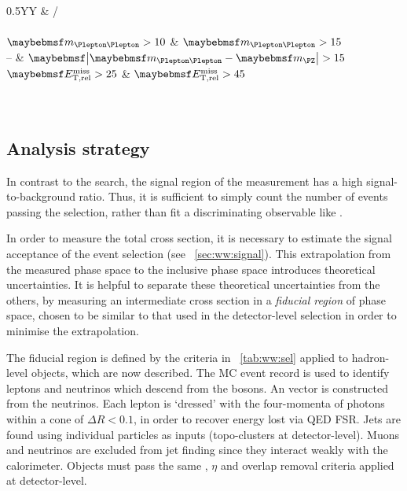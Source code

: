 \begin{description}
	\begin{table}[b]
		\begin{tabularx}{0.5\textwidth}{YY}
			\toprule
			\emch & \eech/\mmch \\
			\midrule
			 \\
			$\mll > 10$    & $\mll > 15$ \\
			--             & $\mods{\mll - \mZ} > 15$ \\
			$\metrel > 25$ & $\metrel > 45$ \\
			 \\
			 \\
			\bottomrule
		\end{tabularx}
		\caption{Summary of \WW event selection. Cuts are given in \GeV.}
		\label{tab:ww:sel}
	\end{table}

\end{description}



\subsection{Analysis strategy}

In contrast to the \HWW search, the signal region of the \WW measurement has a high 
signal-to-background ratio. Thus, it is sufficient to simply count the number of events 
passing the selection, rather than fit a discriminating observable like \mt.

In order to measure the total \WW cross section, it is necessary to estimate the signal 
acceptance of the event selection (see \Section~\ref{sec:ww:signal}). This extrapolation 
from the measured phase space to the inclusive phase space introduces theoretical 
uncertainties. It is helpful to separate these theoretical uncertainties from the others, 
by measuring an intermediate cross section in a \textit{fiducial region} of phase space, 
chosen to be similar to that used in the detector-level selection in order to minimise 
the extrapolation.

The fiducial region is defined by the criteria in \Table~\ref{tab:ww:sel} applied to 
hadron-level objects, which are now described. The MC event record is used to identify 
leptons and neutrinos which descend from the \PW bosons. An \metvec vector is constructed 
from the neutrinos. Each lepton is `dressed' with the four-momenta of photons within a 
cone of $\Delta R < 0.1$, in order to recover energy lost via QED FSR. Jets are found 
using individual particles as inputs (\cf topo-clusters at detector-level). Muons and 
neutrinos are excluded from jet finding since they interact weakly with the calorimeter. 
Objects must pass the same \pt, $\eta$ and overlap removal criteria applied at 
detector-level.


